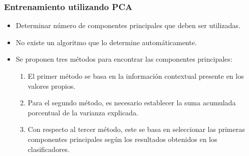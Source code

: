 \documentclass[mathserif]{beamer}
\begin{document}
\begin{frame}
\frametitle{Entrenamiento utilizando PCA}

\begin{itemize}
\item Determinar número de componentes principales que deben ser utilizadas.
\pause
\item No existe un algoritmo que lo determine automáticamente.
\pause
\item Se proponen tres métodos para encontrar las componentes principales:

\begin{enumerate}[1]
\pause
	\item El primer método se basa en la información contextual presente en los valores propios.
	\pause
	\item Para el segundo método, es necesario establecer la suma acumulada porcentual de la varianza explicada.
	\pause
	\item Con respecto al tercer método, este se basa en seleccionar las primeras componentes principales según los resultados obtenidos en los clasificadores.
\end{enumerate}
\end{itemize}

\end{frame}
\end{document}
